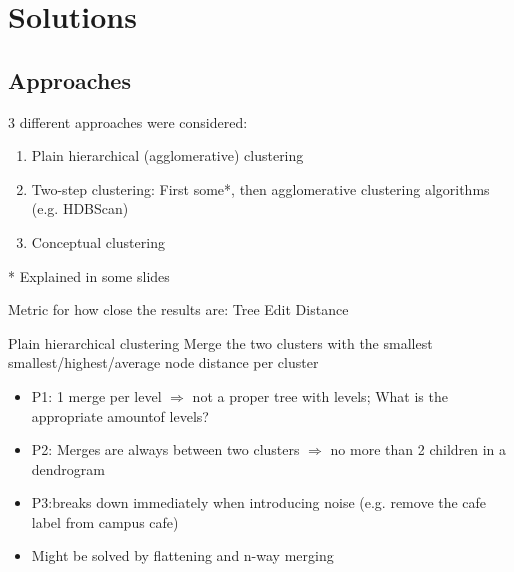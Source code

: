 \documentclass[rgb]{beamer}
\begin{document}
\section{Solutions}
    \subsection{Approaches}
        \begin{frame}
        \sectionpage
        \subsectionpage
        \vspace{1cm}
        3 different approaches were considered:
        
        \begin{enumerate}
            \item Plain hierarchical (agglomerative) clustering
            \item Two-step clustering: First some*, then agglomerative clustering algorithms (e.g. HDBScan)
            \item Conceptual clustering
        \end{enumerate}
        \footnotesize{* Explained in some slides}
        
        Metric for how close the results are: Tree Edit Distance
        \end{frame}
        
    \begin{frame}{Plain hierarchical clustering}
        Merge the two clusters with the smallest smallest/highest/average node distance per cluster
            \begin{itemize}
                \item P1: 1 merge per level $\Rightarrow$ not a proper tree with levels; What is the appropriate amountof levels?
                \item P2: Merges are always between two clusters $\Rightarrow$ no more than 2 children in a dendrogram
                \item P3:breaks down immediately when introducing noise (e.g. remove the cafe label from campus cafe)
                \item Might be solved by flattening and n-way merging
            \end{itemize}
        \end{frame}
        
\end{document}
